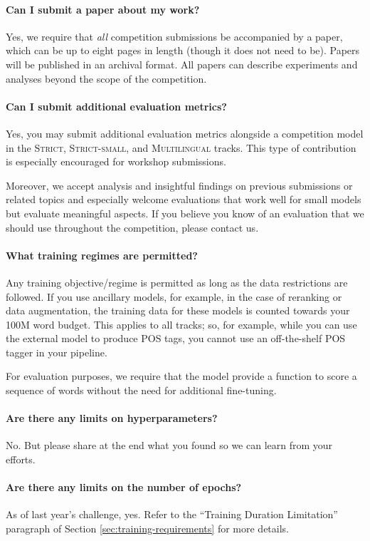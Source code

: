 \documentclass[11pt]{article}
\newcommand{\strict}[1]{\textsc{Strict}}
\newcommand{\strictsmall}[1]{\textsc{Strict-small}}
\newcommand{\multilingual}[1]{\textsc{Multilingual}}
\begin{document}
\paragraph{Can I submit a paper about my work?}
Yes, we require that \emph{all} competition submissions be accompanied by a paper, which can be up to eight pages in length (though it does not need to be). Papers will be published in an archival format. All papers can describe experiments and analyses beyond the scope of the competition.

\paragraph{Can I submit additional evaluation metrics?}
Yes, you may submit additional evaluation metrics alongside a competition model in the \strict{}, \strictsmall{}, and \multilingual{} tracks. This type of contribution is especially encouraged for workshop submissions.

Moreover, we accept analysis and insightful findings on previous submissions or related topics and especially welcome evaluations that work well for small models but evaluate meaningful aspects. If you believe you know of an evaluation that we should use throughout the competition, please contact us.

\paragraph{What training regimes are permitted?}
Any training objective/regime is permitted as long as the data restrictions are followed. If you use ancillary models, for example, in the case of reranking or data augmentation, the training data for these models is counted towards your 100M word budget. This applies to all tracks; so, for example, while you can use the external model to produce POS tags, you cannot use an off-the-shelf POS tagger in your pipeline.

For evaluation purposes, we require that the model provide a function to score a sequence of words without the need for additional fine-tuning.

\paragraph{Are there any limits on hyperparameters?}
No. But please share at the end what you found so we can learn from your efforts.

\paragraph{Are there any limits on the number of epochs?}
As of last year's challenge, yes. Refer to the ``Training Duration Limitation'' paragraph of Section \ref{sec:training-requirements} for more details.
\end{document}
